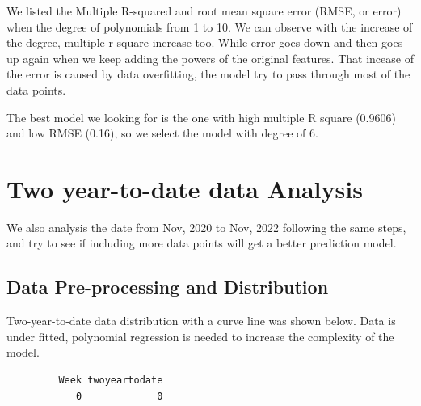 \documentclass[
  letterpaper,
  DIV=11,
  numbers=noendperiod]{scrreport}
\newenvironment{Shaded}{\begin{snugshade}}{\end{snugshade}}
\newcommand{\CommentTok}[1]{\textcolor[rgb]{0.37,0.37,0.37}{#1}}
\newcommand{\FunctionTok}[1]{\textcolor[rgb]{0.28,0.35,0.67}{#1}}
\newcommand{\NormalTok}[1]{\textcolor[rgb]{0.00,0.23,0.31}{#1}}
\newcommand{\OtherTok}[1]{\textcolor[rgb]{0.00,0.23,0.31}{#1}}
\newcommand{\SpecialCharTok}[1]{\textcolor[rgb]{0.37,0.37,0.37}{#1}}
\begin{document}
\begin{Shaded}
\end{Shaded}

We listed the Multiple R-squared and root mean square error (RMSE, or
error) when the degree of polynomials from 1 to 10. We can observe with
the increase of the degree, multiple r-square increase too. While error
goes down and then goes up again when we keep adding the powers of the
original features. That incease of the error is caused by data
overfitting, the model try to pass through most of the data points.

The best model we looking for is the one with high multiple R square
(0.9606) and low RMSE (0.16), so we select the model with degree of 6.

\hypertarget{two-year-to-date-data-analysis}{%
\section{Two year-to-date data
Analysis}\label{two-year-to-date-data-analysis}}

We also analysis the date from Nov, 2020 to Nov, 2022 following the same
steps, and try to see if including more data points will get a better
prediction model.

\hypertarget{data-pre-processing-and-distribution-1}{%
\subsection{Data Pre-processing and
Distribution}\label{data-pre-processing-and-distribution-1}}

Two-year-to-date data distribution with a curve line was shown below.
Data is under fitted, polynomial regression is needed to increase the
complexity of the model.

\begin{verbatim}
         Week twoyeartodate 
            0             0 
\end{verbatim}
\end{document}
